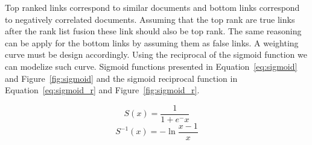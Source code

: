 Top ranked links correspond to similar documents and bottom links correspond to negatively correlated documents.
Assuming that the top rank are true links after the rank list fusion these link should also be top rank.
The same reasoning can be apply for the bottom links by assuming them as false links.
A weighting curve must be design accordingly.
Using the reciprocal of the sigmoid function we can modelize such curve.
Sigmoid functions presented in Equation~\ref{eq:sigmoid} and Figure~\ref{fig:sigmoid} and the sigmoid reciprocal function in Equation~\ref{eq:sigmoid_r} and Figure~\ref{fig:sigmoid_r}.

\begin{equation}
  \label{eq:sigmoid}
  S(x) = \frac{1}{1+e^-x}
\end{equation}
\begin{equation}
  \label{eq:sigmoid_r}
  S^{-1}(x) = -\ln{\frac{x-1}{x}}
\end{equation}

